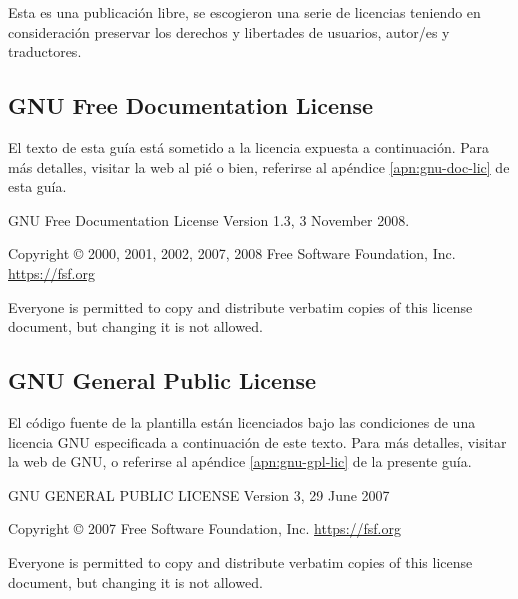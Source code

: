 Esta es una publicación libre, se escogieron una serie de licencias teniendo en consideración preservar los derechos y libertades de usuarios, autor/es y traductores.


\begin{center}\subsection*{GNU Free Documentation License}
El texto de esta guía está sometido a la licencia expuesta a continuación. Para más detalles, visitar la web al pié o bien, referirse al apéndice \ref{apn:gnu-doc-lic} de esta guía.
\begin{center}
GNU Free Documentation License
Version 1.3, 3 November 2008.

Copyright © 2000, 2001, 2002, 2007, 2008 Free Software Foundation, Inc. \url{https://fsf.org}

Everyone is permitted to copy and distribute verbatim copies of this license document, but changing it is not allowed.
\end{center}
\end{center}

\begin{center}\subsection*{GNU General Public License}
El código fuente de la plantilla están licenciados bajo las condiciones de una licencia GNU especificada a continuación de este texto. Para más detalles, visitar la web de GNU, o referirse al apéndice \ref{apn:gnu-gpl-lic} de la presente guía.
\begin{center}
GNU GENERAL PUBLIC LICENSE
Version 3, 29 June 2007

Copyright © 2007 Free Software Foundation, Inc. \url{https://fsf.org}


Everyone is permitted to copy and distribute verbatim copies of this license document, but changing it is not allowed.
\end{center}
\end{center}
